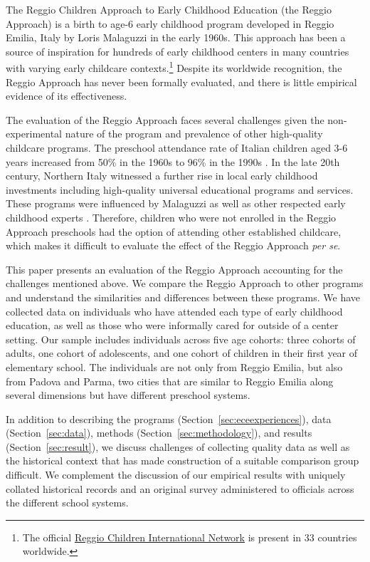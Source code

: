 
The Reggio Children Approach to Early Childhood Education (the Reggio Approach) is a birth to age-6 early childhood program developed in Reggio Emilia, Italy by Loris Malaguzzi in the early 1960s. This approach has been a source of inspiration for hundreds of early childhood centers in many countries with varying early childcare contexts.\footnote{The official \href{http://www.reggiochildren.it/network/?lang=en}{Reggio Children International Network} is present in 33 countries worldwide.} Despite its worldwide recognition, the Reggio Approach has never been formally evaluated, and there is little empirical evidence of its effectiveness. 

The evaluation of the Reggio Approach faces several challenges given the non-experimental nature of the program and prevalence of other high-quality childcare programs. The preschool attendance rate of Italian children aged 3-6 years increased from 50\% in the 1960s to 96\% in the 1990s \citep{Hohnerlein_2015_Development-and-Diffusion}. In the late 20th century, Northern Italy witnessed a further rise in local early childhood investments including high-quality universal educational programs and services. These programs were influenced by Malaguzzi as well as other respected early childhood experts \citep{OECD_2001_Italy-Country-Note}. Therefore, children who were not enrolled in the Reggio Approach preschools had the option of attending other established childcare, which makes it difficult to evaluate the effect of the Reggio Approach \textit{per se}. 

This paper presents an evaluation of the Reggio Approach accounting for the challenges mentioned above. We compare the Reggio Approach to other programs and understand the similarities and differences between these programs. We have collected data on individuals who have attended each type of early childhood education, as well as those who were informally cared for outside of a center setting. Our sample includes individuals across five age cohorts: three cohorts of adults, one cohort of adolescents, and one cohort of children in their first year of elementary school. The individuals are not only from Reggio Emilia, but also from Padova and Parma, two cities that are similar to Reggio Emilia along several dimensions but have different preschool systems.  

In addition to describing the programs (Section~\ref{sec:eceexperiences}), data (Section~\ref{sec:data}), methods (Section~\ref{sec:methodology}), and results (Section~\ref{sec:result}), we discuss challenges of collecting quality data as well as the historical context that has made construction of a suitable comparison group difficult. We complement the discussion of our empirical results with uniquely collated historical records and an original survey administered to officials across the different school systems.

